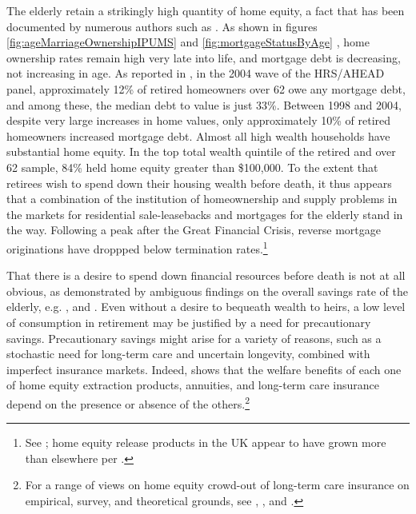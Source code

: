 \documentclass[12pt]{article}
\begin{document}
The elderly retain a strikingly high quantity of home equity, a fact that has
been documented by numerous authors such as \textcite{VentiWise}. As shown in
figures \ref{fig:ageMarriageOwnershipIPUMS} and \ref{fig:mortgageStatusByAge} ,
home ownership rates remain high very late into life, and mortgage debt is
decreasing, not increasing in age.  As reported in \textcite{Davidoffltc}, in
the 2004 wave of the HRS/AHEAD panel, approximately 12\% of retired homeowners
over 62 owe any mortgage debt, and among these, the median debt to value is
just 33\%.  Between 1998 and 2004, despite very large increases in home values,
only approximately 10\% of retired homeowners increased mortgage debt.  Almost
all high wealth households have substantial home equity.  In the top total
wealth quintile of the retired and over 62 sample, 84\% held home equity
greater than \$100,000.  To the extent that retirees wish to spend down their
housing wealth before death, it thus appears that a combination of the
institution of homeownership and supply problems in the markets for residential
sale-leasebacks and mortgages for the elderly stand in the way. Following a
peak after the Great Financial Crisis, reverse mortgage originations have
droppped below termination rates.\footnote{See \textcite{NRMLA2026}; home
equity release products in the UK appear to have grown more than elsewhere per
\textcite{MayerMoulton}.}

That there is a desire to spend down financial resources before death is not at
all obvious, as demonstrated by ambiguous findings on the overall savings rate
of the elderly, e.g.  \textcite{Hurd90}, \textcite{Horioka} and \textcite{Weil}.  Even
without a desire to bequeath wealth to heirs, a low level of consumption in
retirement may be justified by a need for precautionary savings. Precautionary
savings might arise for a variety of reasons, such as a stochastic need for
long-term care and uncertain longevity, combined with imperfect insurance
markets.  Indeed, \textcite{Davidoffpuzzle} shows that the welfare benefits of
each one of home equity extraction products, annuities, and long-term care
insurance depend on the presence or absence of the others.\footnote{For a range of views on home equity crowd-out of long-term care insurance on empirical, survey, and theoretical grounds, see \textcite{Achou}, \textcite{Hanewald}, and \textcite{Hirth}.}
\end{document}
